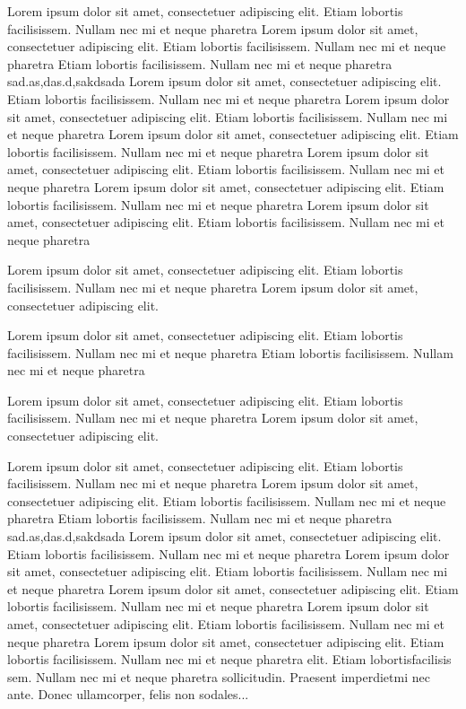 \documentclass[12pt,oneside,justify]{book}
\begin{document}
Lorem ipsum dolor sit amet, consectetuer adipiscing elit.  
Etiam lobortis facilisissem.  Nullam nec mi et neque pharetra  
Lorem ipsum dolor sit amet, consectetuer adipiscing elit.  
Etiam lobortis facilisissem.  Nullam nec mi et neque pharetra Etiam lobortis facilisissem.  Nullam nec mi et neque pharetra 
 sad.as,das.d,sakdsada
Lorem ipsum dolor sit amet, consectetuer adipiscing elit.  
Etiam lobortis facilisissem.  Nullam nec mi et neque pharetra  
Lorem ipsum dolor sit amet, consectetuer adipiscing elit.  
Etiam lobortis facilisissem.  Nullam nec mi et neque pharetra  
Lorem ipsum dolor sit amet, consectetuer adipiscing elit.  
Etiam lobortis facilisissem.  Nullam nec mi et neque pharetra  
Lorem ipsum dolor sit amet, consectetuer adipiscing elit.  
Etiam lobortis facilisissem.  Nullam nec mi et neque pharetra  
Lorem ipsum dolor sit amet, consectetuer adipiscing elit.  
Etiam lobortis facilisissem.  Nullam nec mi et neque pharetra   
Lorem ipsum dolor sit amet, consectetuer adipiscing elit.  
Etiam lobortis facilisissem.  Nullam nec mi et neque pharetra  
 
Lorem ipsum dolor sit amet, consectetuer adipiscing elit.  
Etiam lobortis facilisissem.  Nullam nec mi et neque pharetra Lorem ipsum dolor sit amet, consectetuer adipiscing elit.  
 
Lorem ipsum dolor sit amet, consectetuer adipiscing elit.  
Etiam lobortis facilisissem.  Nullam nec mi et neque pharetra Etiam lobortis facilisissem.  Nullam nec mi et neque pharetra  
 
Lorem ipsum dolor sit amet, consectetuer adipiscing elit.  
Etiam lobortis facilisissem.  Nullam nec mi et neque pharetra Lorem ipsum dolor sit amet, consectetuer adipiscing elit.  
 
Lorem ipsum dolor sit amet, consectetuer adipiscing elit.  
Etiam lobortis facilisissem.  Nullam nec mi et neque pharetra  
Lorem ipsum dolor sit amet, consectetuer adipiscing elit.  
Etiam lobortis facilisissem.  Nullam nec mi et neque pharetra Etiam lobortis facilisissem.  Nullam nec mi et neque pharetra 
 sad.as,das.d,sakdsada
Lorem ipsum dolor sit amet, consectetuer adipiscing elit.  
Etiam lobortis facilisissem.  Nullam nec mi et neque pharetra  
Lorem ipsum dolor sit amet, consectetuer adipiscing elit.  
Etiam lobortis facilisissem.  Nullam nec mi et neque pharetra  
Lorem ipsum dolor sit amet, consectetuer adipiscing elit.  
Etiam lobortis facilisissem.  Nullam nec mi et neque pharetra  
Lorem ipsum dolor sit amet, consectetuer adipiscing elit.  
Etiam lobortis facilisissem.  Nullam nec mi et neque pharetra  
Lorem ipsum dolor sit amet, consectetuer adipiscing elit.  
Etiam lobortis facilisissem.  Nullam nec mi et neque pharetra  elit.   Etiam  lobortisfacilisis sem.  Nullam nec mi et 
neque pharetra sollicitudin.  Praesent imperdietmi nec ante. 
Donec ullamcorper, felis non sodales...
 
\end{document}

